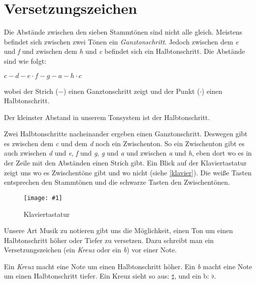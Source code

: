 \documentclass[10pt,a4paper,twoside]{report}
\newcommand{\comment}[1]{
	\marginpar{
		\textsf{#1}
	}
}
\newcommand{\image}[4]{
	\begin{figure}[!ht]
		\centering
		\texttt{[image: \#1]}
		\caption{#2}
		\label{#3}
	\end{figure}
}
\begin{document}
\section{Versetzungszeichen}
Die Abstände zwischen den sieben Stammtönen sind nicht alle gleich. 
Meistens befindet sich zwischen
zwei Tönen ein \emph{Ganztonschritt}. Jedoch zwischen dem \emph{e} und 
\emph{f} und zwischen dem \emph{h} und
\emph{c} befindet sich ein Halbtonschritt. Die Abstände sind wie folgt:
\begin{center}
     \emph{$ c  -  d  -  e \cdot f  -  g  -  a  -  h \cdot c $}
\end{center}
wobei der Strich ($-$) einen Ganztonschritt zeigt und der Punkt 
($\cdot$) einen Halbtonschritt.

Der kleinster Abstand in unserem Tonsystem ist der Halbtonschritt.
\comment{Halbtonschritt\\Ganztonschritt} Zwei Halbtonschritte nacheinander 
ergeben einen Ganztonschritt. Deswegen gibt es zwischen dem 
\emph{c} und dem \emph{d} noch ein
Zwischenton. So ein Zwischenton gibt es auch zwischen
\emph{d} und \emph{e}, \emph{f} und \emph{g},
\emph{g} und \emph{a} und zwischen \emph{a} und \emph{h}, 
eben dort wo es in der Zeile mit den Abständen
einen Strich gibt. Ein Blick auf der Klaviertastatur 
zeigt uns wo es Zwischentöne gibt und wo nicht 
(siehe \autoref{klavier}). Die weiße Tasten entsprechen 
den Stammtönen und die schwarze Tasten den 
Zwischentönen.
\image{klavier.jpg}{Klaviertastatur}{klavier}{5}

Unsere Art Musik zu notieren gibt uns die Möglichkeit, 
einen Ton um einen Halbtonschritt 
höher oder Tiefer zu versetzen. Dazu schreibt man ein Versetzungszeichen 
(ein \emph{Kreuz} oder ein \emph{b}) vor einer Note.
\comment{Kreuz: $\sharp$\\b: $\flat$}
Ein \emph{Kreuz} macht eine Note um einen Halbtonschritt höher. 
Ein \emph{b} macht eine 
Note um einen Halbtonschritt tiefer. Ein Kreuz sieht so 
aus: $\sharp$, und ein b: $\flat$.
\end{document}
